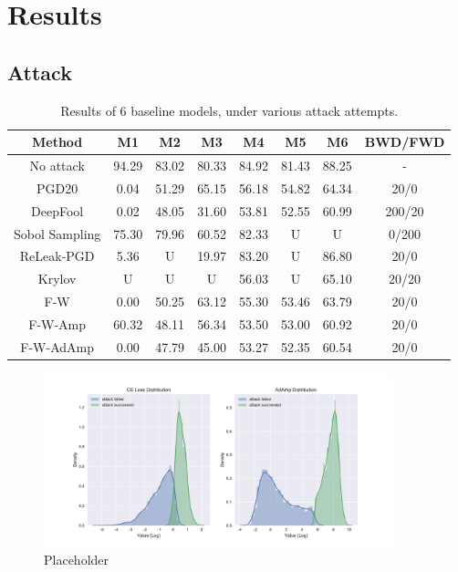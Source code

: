 \documentclass{article}
\begin{document}
\section{Results}\label{sec:Results}
    \subsection{Attack}\label{subs:AttackExp}
    \begin{table}[h]
        \centering
        \begin{tabular}{cccccccc}
        \hline
            Method & M1 & M2 & M3 & M4 & M5 & M6 & BWD/FWD \\ \hline
            No attack & 94.29 & 83.02 & 80.33 & 84.92 & 81.43 & 88.25 & - \\
            PGD20 & 0.04 & 51.29 & 65.15 & 56.18 & 54.82 & 64.34 & 20/0 \\
            DeepFool & 0.02 & 48.05 & 31.60 & 53.81 & 52.55 & 60.99 & 200/20 \\
            Sobol Sampling & 75.30 & 79.96 & 60.52 & 82.33 & U & U & 0/200 \\
            ReLeak-PGD & 5.36 & U & 19.97 & 83.20 & U & 86.80 & 20/0 \\
            Krylov & U & U & U & 56.03 & U & 65.10 & 20/20 \\
            F-W & 0.00 & 50.25 & 63.12 & 55.30 & 53.46 & 63.79 & 20/0 \\
            F-W-Amp & 60.32 & 48.11 & 56.34 & 53.50 & 53.00 & 60.92 & 20/0 \\
            F-W-AdAmp & 0.00 & 47.79 & 45.00 & 53.27 & 52.35 & 60.54 & 20/0 \\ \hline
        \end{tabular}
        \caption{Results of 6 baseline models, under various attack attempts.}
    \end{table}
    \begin{figure}[H]
        \centering
        \includegraphics[width=0.9\textwidth]{figs/ce_adamp_distribution.pdf}
        \caption{Placeholder}
        \label{fig:loss_distribution}
    \end{figure}
\end{document}
